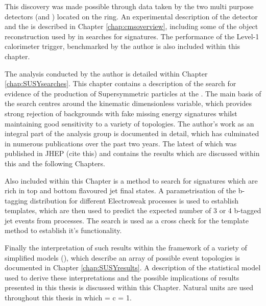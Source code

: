 This discovery was made possible through data taken by the two multi purpose detectors (\CMS and \ATLAS) located on the \LHC ring. An experimental description of the \CMS detector and the \LHC is described in Chapter \ref{chap:cmsoverview}, including some of the object reconstruction used by \CMS in searches for \SUSY signatures. The performance of the \CMS Level-1 calorimeter trigger, benchmarked by the author is also included within this chapter.

The analysis conducted by the author is detailed within Chapter \ref{chap:SUSYsearches}. This chapter contains a description of the search for evidence of the production of Supersymmetric particles at the \LHC. The main basis of the search centres around the kinematic dimensionless \alphat variable, which provides strong rejection of backgrounds with fake missing energy signatures whilst maintaining good sensitivity to a variety of \SUSY topologies. The author's work as an integral part of the analysis group is documented in detail, which has culminated in numerous publications over the past two years. The latest of which was published in JHEP (cite this) and contains the results which are discussed within this and the following Chapters.

Also included within this Chapter is a method to search for \SUSY signatures which are rich in top and bottom flavoured jet final states. A parametrisation of the b-tagging distribution for different Electroweak processes is used to establish templates, which are then used to predict the expected number of 3 or 4 b-tagged jet events from \SM processes. The \alphat search is used as a cross check for the template method to establish it's functionality. 

Finally the interpretation of such results within the framework of a variety of simplified models (\SMS), which describe an array of possible \SUSY event topologies is documented in Chapter \ref{chap:SUSYresults}. A description of the statistical model used to derive these interpretations and the possible implications of results presented in this thesis is discussed within this Chapter. Natural units are used throughout this thesis in which \hbarred = c = 1.